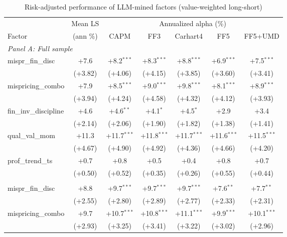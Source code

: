 \begin{table}[htbp]\centering
\caption{Risk-adjusted performance of LLM-mined factors (value-weighted long-short)}
\label{tab:alphas_vw}
\begin{threeparttable}\footnotesize
\begin{tabular}{lcccccc}
\toprule
 & Mean LS & \multicolumn{5}{c}{Annualized alpha (\%)} \\
\cmidrule(lr){3-7}
Factor & (ann \%) & CAPM & FF3 & Carhart4 & FF5 & FF5+UMD \\
\midrule
\multicolumn{7}{l}{\textit{Panel A: Full sample}} \\
\addlinespace
mispr\_fin\_disc & +7.6 & +8.2$^{***}$ & +8.3$^{***}$ & +8.8$^{***}$ & +6.9$^{***}$ & +7.5$^{***}$ \\
 & (+3.82) & (+4.06) & (+4.15) & (+3.85) & (+3.60) & (+3.41) \\
\addlinespace
mispricing\_combo & +7.9 & +8.5$^{***}$ & +9.0$^{***}$ & +9.8$^{***}$ & +8.1$^{***}$ & +8.9$^{***}$ \\
 & (+3.94) & (+4.24) & (+4.58) & (+4.32) & (+4.12) & (+3.93) \\
\addlinespace
fin\_inv\_discipline & +4.6 & +4.6$^{**}$ & +4.1$^{*}$ & +4.5$^{*}$ & +2.9 & +3.4 \\
 & (+2.14) & (+2.06) & (+1.90) & (+1.82) & (+1.38) & (+1.41) \\
\addlinespace
qual\_val\_mom & +11.3 & +11.7$^{***}$ & +11.8$^{***}$ & +11.7$^{***}$ & +11.6$^{***}$ & +11.5$^{***}$ \\
 & (+4.67) & (+4.90) & (+4.92) & (+4.36) & (+4.66) & (+4.20) \\
\addlinespace
prof\_trend\_ts & +0.7 & +0.8 & +0.5 & +0.4 & +0.8 & +0.7 \\
 & (+0.50) & (+0.52) & (+0.35) & (+0.26) & (+0.55) & (+0.44) \\
\addlinespace
\midrule
\multicolumn{7}{l}{\textit{Panel B: Out-of-sample (post-2000-12-31)}} \\
\addlinespace
mispr\_fin\_disc & +8.8 & +9.7$^{***}$ & +9.7$^{***}$ & +9.7$^{***}$ & +7.6$^{**}$ & +7.7$^{**}$ \\
 & (+2.55) & (+2.80) & (+2.89) & (+2.77) & (+2.33) & (+2.31) \\
\addlinespace
mispricing\_combo & +9.7 & +10.7$^{***}$ & +10.8$^{***}$ & +11.1$^{***}$ & +9.9$^{***}$ & +10.1$^{***}$ \\
 & (+2.93) & (+3.25) & (+3.41) & (+3.22) & (+3.02) & (+2.96) \\

\end{tabular}
\end{threeparttable}
\end{table}
